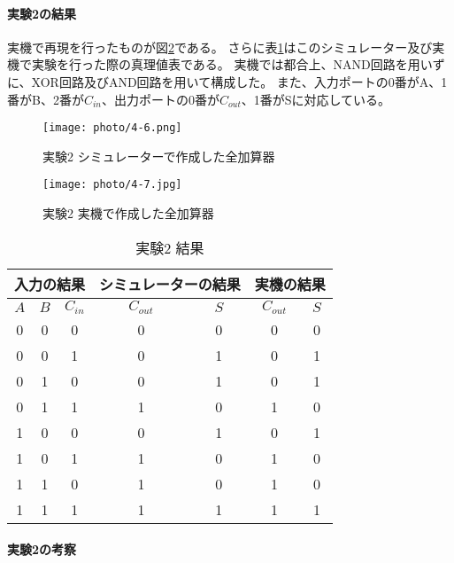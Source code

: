 \documentclass[dvipdfmx]{jsarticle}
\begin{document}
\paragraph{実験2の結果}
実機で再現を行ったものが図\ref{fig:4-7}である。
さらに表\ref{tb:4-4}はこのシミュレーター及び実機で実験を行った際の真理値表である。
実機では都合上、NAND回路を用いずに、XOR回路及びAND回路を用いて構成した。
また、入力ポートの0番がA、1番がB、2番が$C_{in}$、出力ポートの0番が$C_{out}$、1番がSに対応している。

\begin{figure}[hbtp]
  \begin{center}
    \texttt{[image: photo/4-6.png]}
  \end{center}
  \caption{実験2 シミュレーターで作成した全加算器}
  \label{fig:4-6}
\end{figure}

\begin{figure}
  \begin{center}
    \texttt{[image: photo/4-7.jpg]}
  \end{center}
  \caption{実験2 実機で作成した全加算器}
  \label{fig:4-7}
\end{figure}

\begin{table}[hbtp]
  \caption{実験2 結果}
  \centering
  \begin{tabular}{|c|c|c|c|c|c|c|} \hline
    \multicolumn{3}{|c|}{入力の結果} & \multicolumn{2}{c|}{シミュレーターの結果} & \multicolumn{2}{c|}{実機の結果} \\ \hline
    $A$ & $B$ & $C_{in}$ & $C_{out}$ & $S$ & $C_{out}$ & $S$\\ \hline
    0 & 0 & 0 & 0 & 0 & 0 & 0\\ \hline
    0 & 0 & 1 & 0 & 1 & 0 & 1\\ \hline
    0 & 1 & 0 & 0 & 1 & 0 & 1\\ \hline
    0 & 1 & 1 & 1 & 0 & 1 & 0\\ \hline
    1 & 0 & 0 & 0 & 1 & 0 & 1\\ \hline
    1 & 0 & 1 & 1 & 0 & 1 & 0\\ \hline
    1 & 1 & 0 & 1 & 0 & 1 & 0\\ \hline
    1 & 1 & 1 & 1 & 1 & 1 & 1\\ \hline
  \end{tabular}
  \label{tb:4-4}
\end{table}

\paragraph{実験2の考察}
\end{document}

